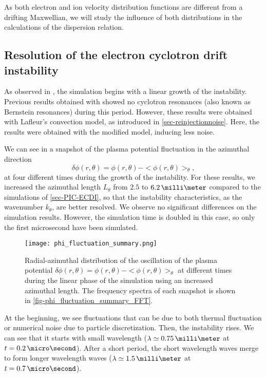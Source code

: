   As both electron and ion velocity distribution functions are different from a drifting Maxwellian, we will study the influence of both distributions in the calculations of the dispersion relation.
  
  
  \FloatBarrier
  \subsection{Resolution of the electron cyclotron drift instability} \label{subsec-ECDIPIC}
  
    As observed in , the simulation begins with a linear growth of the instability.
    Previous results obtained with \LPPic \citep{croes2017a} showed no cyclotron resonances (also known as Bernstein resonances) during this period.
    However, these results were obtained with Lafleur's convection model, as introduced in \cref{sec-reinjectionnoise}.
    Here, the results were obtained with the modified model, inducing less noise.
    
    We can see in   a snapshot of the plasma potential fluctuation in the azimuthal direction \[ \delta \phi(r, \theta) = \phi(r, \theta) - < \phi(r, \theta) >_{ \theta}, \]
    at four different times during the growth of the instability.
    For these results, we increased the azimuthal length $L_{\theta}$ from $2.5$ to $6.2\,\milli\meter$ compared to the simulations of \cref{sec-PIC-ECDI}, so that the instability characteristics, as the wavenumber $k_{\theta}$, are better resolved.
    We observe no significant differences on the simulation results.
    However, the simulation time is doubled in this case, so only the first microsecond have been simulated.
    
    \begin{figure}[!hbt]
      \centering
      \texttt{[image: phi\_fluctuation\_summary.png]}
      \caption{Radial-azimuthal distribution of the oscillation of the plasma potential $\delta \phi(r, \theta) = \phi(r, \theta) - < \phi(r, \theta) >_{ \theta}$ at different times during the linear phase of the simulation using an increased azimuthal length. The frequency spectra of each snapshot is shown in \cref{fig-phi_fluctuation_summary_FFT}. }
      \label{fig-phi_fluctuation_summary}
    \end{figure}
    
    At the beginning, we see fluctuations that can be due to both thermal fluctuation \citep{salpeter1960} or numerical noise due to particle discretization.
    Then, the instability rises.
    We can see that it starts with small wavelength ($\lambda \simeq 0.75\,\milli\meter$ at $t=0.2\,\micro\second$).
    After a short period, the short wavelength waves merge to form longer wavelength waves  ($\lambda \simeq 1.5\,\milli\meter$ at $t=0.7\,\micro\second$).
    
